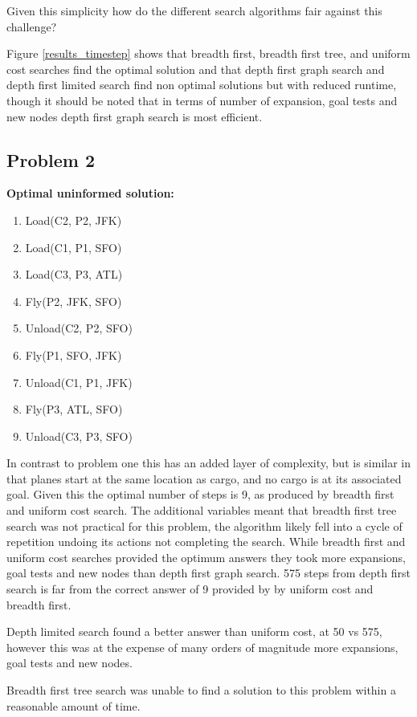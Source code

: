 \documentclass[11pt]{article}
\begin{document}
Given this simplicity how do the different search algorithms fair against this challenge?

Figure \ref{results_timestep} shows that breadth first, breadth first tree, and uniform cost searches find the optimal solution and that depth first graph search and depth first limited search find non optimal solutions but with reduced runtime, though it should be noted that in terms of number of expansion, goal tests and new nodes depth first graph search is most efficient. 

\subsection{Problem 2}

\textbf{Optimal uninformed solution:}
\begin{enumerate}
	\item Load(C2, P2, JFK)
	\item Load(C1, P1, SFO)
	\item Load(C3, P3, ATL)
	\item Fly(P2, JFK, SFO)
	\item Unload(C2, P2, SFO)
	\item Fly(P1, SFO, JFK)
	\item Unload(C1, P1, JFK)
	\item Fly(P3, ATL, SFO)
	\item Unload(C3, P3, SFO)
\end{enumerate}

In contrast to problem one this has an added layer of complexity, but is similar in that planes start at the same location as cargo, and no cargo is at its associated goal. Given this the optimal number of steps is 9, as produced by breadth first and uniform cost search. The additional variables meant that breadth first tree search was not practical for this problem, the algorithm likely fell into a cycle of repetition undoing its actions not completing the search. While breadth first and uniform cost searches provided the optimum answers they took more expansions, goal tests and new nodes than depth first graph search. 575 steps from depth first search is far from the correct answer of 9 provided by by uniform cost and breadth first.

Depth limited search found a better answer than uniform cost, at 50 vs 575, however this was at the expense of many orders of magnitude more expansions, goal tests and new nodes. 

Breadth first tree search was unable to find a solution to this problem within a reasonable amount of time.
\end{document}
